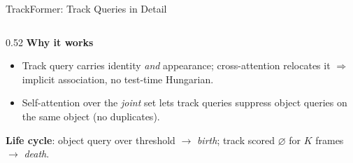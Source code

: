 \begin{frame}[fragile]{TrackFormer: Track Queries in Detail}
\begin{columns}[T]
\begin{column}{0.52\textwidth}
      \vspace{0.2em}
      \textbf{Why it works}
      \begin{itemize}
        \item Track query carries identity \emph{and} appearance; cross-attention relocates it $\Rightarrow$ implicit association, no test-time Hungarian.
        \item Self-attention over the \emph{joint} set lets track queries suppress object queries on the same object (no duplicates).
      \end{itemize}

      \vspace{0.2em}
      \textbf{Life cycle}: object query over threshold $\to$ \emph{birth}; track scored $\varnothing$ for $K$ frames $\to$ \emph{death}.

    \end{column}
  \end{columns}
\end{frame}

